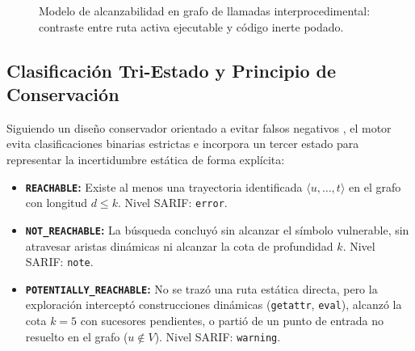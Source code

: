 \documentclass[conference]{IEEEtran}
\begin{document}
\begin{figure}[!htbp]
{
}
\caption{Modelo de alcanzabilidad en grafo de llamadas interprocedimental: contraste entre ruta activa ejecutable y código inerte podado.}
\label{fig:tikz_reachability}
\end{figure}

\subsection{Clasificación Tri-Estado y Principio de Conservación}
Siguiendo un diseño conservador orientado a evitar falsos negativos \cite{nielson1999principles}, el motor evita clasificaciones binarias estrictas e incorpora un tercer estado para representar la incertidumbre estática de forma explícita:
\begin{itemize}
    \item \textbf{\texttt{REACHABLE}:} Existe al menos una trayectoria identificada $\langle u, \dots, t \rangle$ en el grafo con longitud $d \le k$. Nivel SARIF: \texttt{error}.
    \item \textbf{\texttt{NOT\_REACHABLE}:} La búsqueda concluyó sin alcanzar el símbolo vulnerable, sin atravesar aristas dinámicas ni alcanzar la cota de profundidad $k$. Nivel SARIF: \texttt{note}.
    \item \textbf{\texttt{POTENTIALLY\_REACHABLE}:} No se trazó una ruta estática directa, pero la exploración interceptó construcciones dinámicas (\texttt{getattr}, \texttt{eval}), alcanzó la cota $k=5$ con sucesores pendientes, o partió de un punto de entrada no resuelto en el grafo ($u \notin V$). Nivel SARIF: \texttt{warning}.
\end{itemize}
\end{document}

